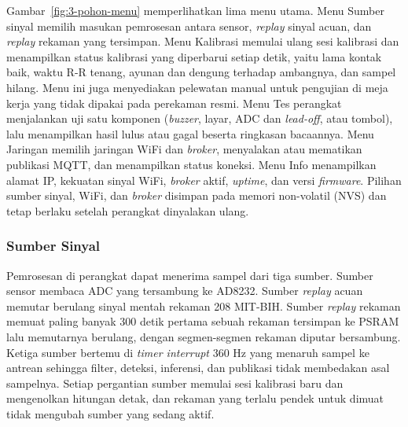 Gambar~\ref{fig:3-pohon-menu} memperlihatkan lima menu utama. Menu Sumber sinyal memilih masukan pemrosesan antara sensor, \textit{replay} sinyal acuan, dan \textit{replay} rekaman yang tersimpan. Menu Kalibrasi memulai ulang sesi kalibrasi dan menampilkan status kalibrasi yang diperbarui setiap detik, yaitu lama kontak baik, waktu R-R tenang, ayunan dan dengung terhadap ambangnya, dan sampel hilang. Menu ini juga menyediakan pelewatan manual untuk pengujian di meja kerja yang tidak dipakai pada perekaman resmi. Menu Tes perangkat menjalankan uji satu komponen (\textit{buzzer}, layar, ADC dan \textit{lead-off}, atau tombol), lalu menampilkan hasil lulus atau gagal beserta ringkasan bacaannya. Menu Jaringan memilih jaringan WiFi dan \textit{broker}, menyalakan atau mematikan publikasi MQTT, dan menampilkan status koneksi. Menu Info menampilkan alamat IP, kekuatan sinyal WiFi, \textit{broker} aktif, \textit{uptime}, dan versi \textit{firmware}. Pilihan sumber sinyal, WiFi, dan \textit{broker} disimpan pada memori non-volatil (NVS) dan tetap berlaku setelah perangkat dinyalakan ulang.

\subsubsection{Sumber Sinyal}

Pemrosesan di perangkat dapat menerima sampel dari tiga sumber. Sumber sensor membaca ADC yang tersambung ke AD8232. Sumber \textit{replay} acuan memutar berulang sinyal mentah rekaman 208 MIT-BIH. Sumber \textit{replay} rekaman memuat paling banyak 300 detik pertama sebuah rekaman tersimpan ke PSRAM lalu memutarnya berulang, dengan segmen-segmen rekaman diputar bersambung. Ketiga sumber bertemu di \textit{timer interrupt} 360 Hz yang menaruh sampel ke antrean sehingga filter, deteksi, inferensi, dan publikasi tidak membedakan asal sampelnya. Setiap pergantian sumber memulai sesi kalibrasi baru dan mengenolkan hitungan detak, dan rekaman yang terlalu pendek untuk dimuat tidak mengubah sumber yang sedang aktif.

